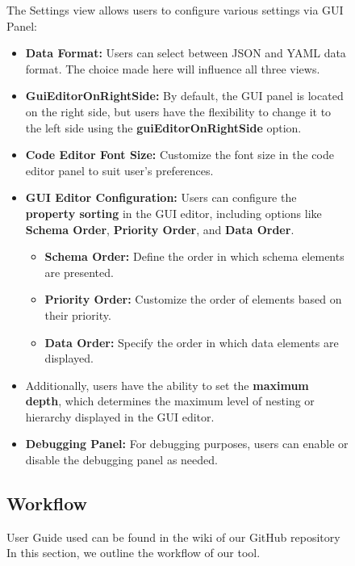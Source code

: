 \begin{figure}[h]
The Settings view allows users to configure various settings via GUI Panel:
\begin{itemize}
    \item \textbf{Data Format:} Users can select between JSON and YAML data format.
    The choice made here will influence all three views.
    \item \textbf{GuiEditorOnRightSide:} By default, the GUI panel is located on the right side, but users have the flexibility to change it to the left side using the \textbf{guiEditorOnRightSide} option.
    \item \textbf{Code Editor Font Size:} Customize the font size in the code editor panel to suit user's preferences.
    \item \textbf{GUI Editor Configuration:} Users can configure the \textbf{property sorting} in the GUI editor, including options like \textbf{Schema Order}, \textbf{Priority Order}, and \textbf{Data Order}.
    \begin{itemize}
        \item \textbf{Schema Order:} Define the order in which schema elements are presented.
        \item \textbf{Priority Order:} Customize the order of elements based on their priority.
        \item \textbf{Data Order:} Specify the order in which data elements are displayed.
    \end{itemize}
    \item Additionally, users have the ability to set the \textbf{maximum depth}, which determines the maximum level of nesting or hierarchy displayed in the GUI editor.
    \item \textbf{Debugging Panel:} For debugging purposes, users can enable or disable the debugging panel as needed.
\end{itemize}

\subsection{Workflow}\label{subsec:workflow} User Guide used can be found in the wiki of our GitHub repository %
In this section, we outline the workflow of our tool.


\end{figure}
